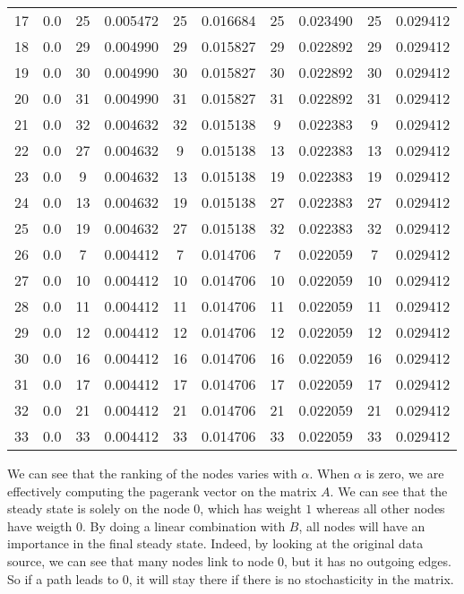 \documentclass[]{article}
\begin{document}
\begin{center}
{\begin{tabular}{|c|c|c|c|c|c|c|c|c|c|}
17 & 0.0 & 25 &   0.005472 & 25 & 0.016684 & 25 & 0.023490 & 25 & 0.029412\\
18 & 0.0 & 29 &   0.004990 & 29 & 0.015827 & 29 & 0.022892 & 29 & 0.029412\\
19 & 0.0 & 30 &   0.004990 & 30 & 0.015827 & 30 & 0.022892 & 30 & 0.029412\\
20 & 0.0 & 31 &   0.004990 & 31 & 0.015827 & 31 & 0.022892 & 31 & 0.029412\\
21 & 0.0 & 32 &   0.004632 & 32 & 0.015138 & 9 & 0.022383 & 9 & 0.029412\\
22 & 0.0 & 27 &   0.004632 & 9 & 0.015138 & 13 & 0.022383 & 13 & 0.029412\\
23 & 0.0 & 9  &  0.004632 & 13 & 0.015138 & 19 & 0.022383 & 19 & 0.029412\\
24 & 0.0 & 13 &   0.004632 & 19 & 0.015138 & 27 & 0.022383 & 27 & 0.029412\\
25 & 0.0 & 19 &   0.004632 & 27 & 0.015138 & 32 & 0.022383 & 32 & 0.029412\\
26 & 0.0 & 7  &  0.004412 & 7 & 0.014706 & 7 & 0.022059 & 7 & 0.029412\\
27 & 0.0 & 10 &   0.004412 & 10 & 0.014706 & 10 & 0.022059 & 10 & 0.029412\\
28 & 0.0 & 11 &   0.004412 & 11 & 0.014706 & 11 & 0.022059 & 11 & 0.029412\\
29 & 0.0 & 12 &   0.004412 & 12 & 0.014706 & 12 & 0.022059 & 12 & 0.029412\\
30 & 0.0 & 16 &   0.004412 & 16 & 0.014706 & 16 & 0.022059 & 16 & 0.029412\\
31 & 0.0 & 17 &   0.004412 & 17 & 0.014706 & 17 & 0.022059 & 17 & 0.029412\\
32 & 0.0 & 21 &   0.004412 & 21 & 0.014706 & 21 & 0.022059 & 21 & 0.029412\\
33 & 0.0 & 33 &   0.004412 & 33 & 0.014706 & 33 & 0.022059 & 33 & 0.029412\\
\hline
\end{tabular}}
\end{center}

We can see that the ranking of the nodes varies with $\alpha$. When $\alpha$ is zero, we are effectively computing the pagerank vector on the matrix $A$. We can see that the steady state is solely on the node $0$, which has weight $1$ whereas all other nodes have weigth $0$. By doing a linear combination with $B$, all nodes will have an importance in the final steady state. Indeed, by looking at the original data source, we can see that many nodes link to node $0$, but it has no outgoing edges. So if a path leads to $0$, it will stay there if there is no stochasticity in the matrix.
\end{document}
